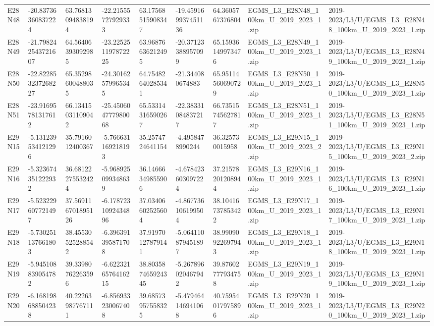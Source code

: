 \begin{landscape}
\begin{longtable}{lllllllll}
E28N48 & -20.83736360837224 & 63.76813094838194 & -22.21555727929333 & 63.17568515908347 & -19.459169937451136 & 64.3605767376804 & EGMS\_L3\_E28N48\_100km\_U\_2019\_2023\_1.zip & 2019-2023/L3/U/EGMS\_L3\_E28N48\_100km\_U\_2019\_2023\_1.zip \\
E28N49 & -21.798242543721607 & 64.56406393092985 & -23.225251197872225 & 63.96876636212495 & -20.37123388957099 & 65.15936149973476 & EGMS\_L3\_E28N49\_100km\_U\_2019\_2023\_1.zip & 2019-2023/L3/U/EGMS\_L3\_E28N49\_100km\_U\_2019\_2023\_1.zip \\
E28N50 & -22.822853237268227 & 65.35298600488035 & -24.30162579965345 & 64.75482640285341 & -21.344080674883 & 65.95114560690729 & EGMS\_L3\_E28N50\_100km\_U\_2019\_2023\_1.zip & 2019-2023/L3/U/EGMS\_L3\_E28N50\_100km\_U\_2019\_2023\_1.zip \\
E28N51 & -23.91695781317612 & 66.13415031109042 & -25.450604777980068 & 65.53314316590267 & -22.38331084837217 & 66.73515745627817 & EGMS\_L3\_E28N51\_100km\_U\_2019\_2023\_1.zip & 2019-2023/L3/U/EGMS\_L3\_E28N51\_100km\_U\_2019\_2023\_1.zip \\
E29N15 & -5.131239534121296 & 35.7916012400367 & -5.766631169218193 & 35.2574724641154 & -4.4958478990244 & 36.325730015958 & EGMS\_L3\_E29N15\_100km\_U\_2019\_2023\_2.zip & 2019-2023/L3/U/EGMS\_L3\_E29N15\_100km\_U\_2019\_2023\_2.zip \\
E29N16 & -5.323674351222932 & 36.68122275532424 & -5.968925099348639 & 36.14666349855906 & -4.678423603097224 & 37.21578201208944 & EGMS\_L3\_E29N16\_100km\_U\_2019\_2023\_1.zip & 2019-2023/L3/U/EGMS\_L3\_E29N16\_100km\_U\_2019\_2023\_1.zip \\
E29N17 & -5.523229607721497 & 37.569116701895126 & -6.1787231092434896 & 37.03406602525604 & -4.867736106199504 & 38.10416737853422 & EGMS\_L3\_E29N17\_100km\_U\_2019\_2023\_1.zip & 2019-2023/L3/U/EGMS\_L3\_E29N17\_100km\_U\_2019\_2023\_1.zip \\
E29N18 & -5.730251137661803 & 38.45530525288542 & -6.396391395871708 & 37.91970127879141 & -5.064110879451897 & 38.99090922697943 & EGMS\_L3\_E29N18\_100km\_U\_2019\_2023\_1.zip & 2019-2023/L3/U/EGMS\_L3\_E29N18\_100km\_U\_2019\_2023\_1.zip \\
E29N19 & -5.945108839054782 & 39.33980762263596 & -6.6223216576416215 & 38.803587465924345 & -5.267896020467942 & 39.87602777934758 & EGMS\_L3\_E29N19\_100km\_U\_2019\_2023\_1.zip & 2019-2023/L3/U/EGMS\_L3\_E29N19\_100km\_U\_2019\_2023\_1.zip \\
E29N20 & -6.168198688504238 & 40.22263987767111 & -6.856933230067408 & 39.68573957558325 & -5.479464146941068 & 40.75954017975896 & EGMS\_L3\_E29N20\_100km\_U\_2019\_2023\_1.zip & 2019-2023/L3/U/EGMS\_L3\_E29N20\_100km\_U\_2019\_2023\_1.zip \\

\end{longtable}
\end{landscape}
